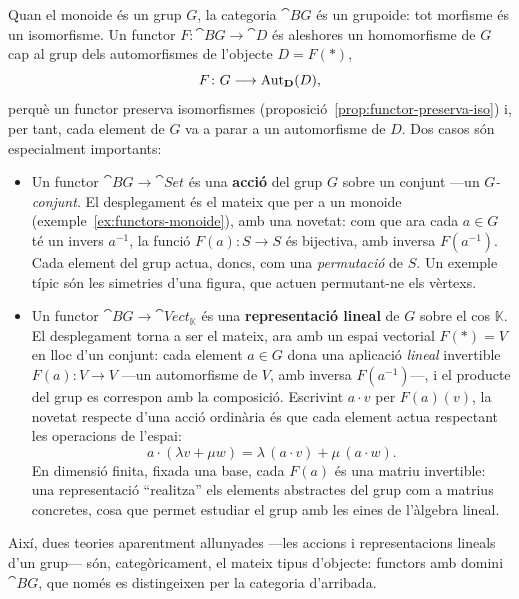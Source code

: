 \begin{exemple}
Quan el monoide és un grup $G$, la categoria $\cat{B}G$ és un grupoide: tot morfisme és un isomorfisme. Un functor $F\colon\cat{B}G\to\cat{D}$ és aleshores un homomorfisme de $G$ cap al grup dels automorfismes de l'objecte $D=F(\ast)$,
\[
F\colon G\longrightarrow \operatorname{Aut}_{\mathbf{D}}(D),
\]
perquè un functor preserva isomorfismes (proposició~\ref{prop:functor-preserva-iso}) i, per tant, cada element de $G$ va a parar a un automorfisme de $D$. Dos casos són especialment importants:
\begin{itemize}
\item Un functor $\cat{B}G\to\cat{Set}$ és una \textbf{acció} del grup $G$ sobre un conjunt ---un \emph{$G$-conjunt}. El desplegament és el mateix que per a un monoide (exemple~\ref{ex:functors-monoide}), amb una novetat: com que ara cada $a\in G$ té un invers $a^{-1}$, la funció $F(a)\colon S\to S$ és bijectiva, amb inversa $F(a^{-1})$. Cada element del grup actua, doncs, com una \emph{permutació} de $S$. Un exemple típic són les simetries d'una figura, que actuen permutant-ne els vèrtexs.
\item Un functor $\cat{B}G\to\cat{Vect}_{\mathbb K}$ és una \textbf{representació lineal} de $G$ sobre el cos $\mathbb{K}$. El desplegament torna a ser el mateix, ara amb un espai vectorial $F(\ast)=V$ en lloc d'un conjunt: cada element $a\in G$ dona una aplicació \emph{lineal} invertible $F(a)\colon V\to V$ ---un automorfisme de $V$, amb inversa $F(a^{-1})$---, i el producte del grup es correspon amb la composició. Escrivint $a\cdot v$ per $F(a)(v)$, la novetat respecte d'una acció ordinària és que cada element actua respectant les operacions de l'espai:
\[
a\cdot(\lambda v+\mu w)=\lambda\,(a\cdot v)+\mu\,(a\cdot w).
\]
En dimensió finita, fixada una base, cada $F(a)$ és una matriu invertible: una representació \enquote{realitza} els elements abstractes del grup com a matrius concretes, cosa que permet estudiar el grup amb les eines de l'àlgebra lineal.
\end{itemize}
Així, dues teories aparentment allunyades ---les accions i representacions lineals d'un grup--- són, categòricament, el mateix tipus d'objecte: functors amb domini $\cat{B}G$, que només es distingeixen per la categoria d'arribada.
\end{exemple}

